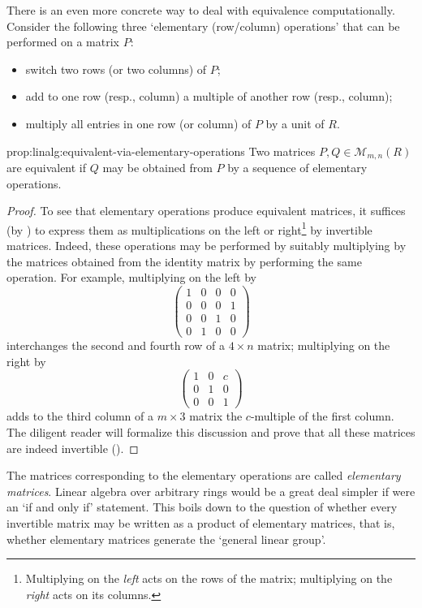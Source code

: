 There is an even more concrete way to deal with equivalence
computationally. Consider the following three `elementary (row/column)
operations' that can be performed on a matrix $P$:
\begin{itemize}
\item switch two rows (or two columns) of $P$;
\item add to one row (resp., column) a multiple of another row (resp.,
  column);
\item multiply all entries in one row (or column) of $P$ by a unit of
  $R$.
\end{itemize}
\begin{prop}{}{prop:linalg:equivalent-via-elementary-operations}
  Two matrices $P, Q \in \mathcal{M}_{m,n}(R)$ are equivalent if $Q$
  may be obtained from $P$ by a sequence of elementary operations.
\end{prop}
\begin{proof}
  To see that elementary operations produce equivalent matrices, it
  suffices (by ) to express them as multiplications
  on the left or right\footnote{Multiplying on the \emph{left} acts on
    the rows of the matrix; multiplying on the \emph{right} acts on
    its columns.} by invertible matrices. Indeed, these operations may
  be performed by suitably multiplying by the matrices obtained from
  the identity matrix by performing the same operation. For example,
  multiplying on the left by
  \[
    \begin{pmatrix}
      1 & 0 & 0 & 0 \\
      0 & 0 & 0 & 1 \\
      0 & 0 & 1 & 0 \\
      0 & 1 & 0 & 0
    \end{pmatrix}
  \]
  interchanges the second and fourth row of a $4 \times n$ matrix;
  multiplying on the right by
  \[
    \begin{pmatrix}
      1 & 0 & c \\
      0 & 1 & 0 \\
      0 & 0 & 1
    \end{pmatrix}
  \]
  adds to the third column of a $m \times 3$ matrix the $c$-multiple
  of the first column. The diligent reader will formalize this
  discussion and prove that all these matrices are indeed invertible
  ().
\end{proof}

The matrices corresponding to the elementary operations are called
\emph{elementary matrices}. Linear algebra over arbitrary rings would
be a great deal simpler if  were an `if and only if'
statement. This boils down to the question of whether every invertible
matrix may be written as a product of elementary matrices, that is,
whether elementary matrices generate the `general linear group'.

